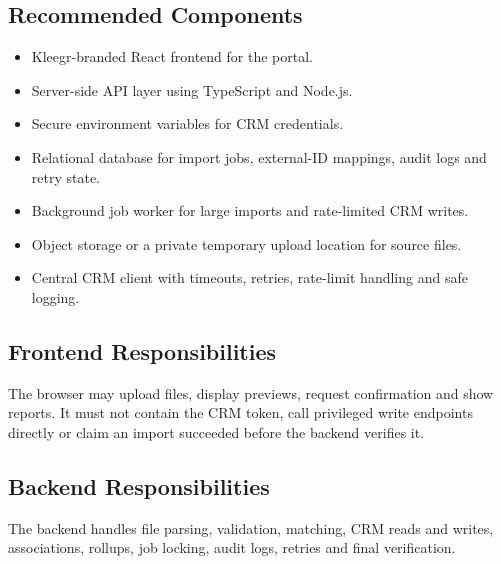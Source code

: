 \documentclass[10pt]{article}
\begin{document}
\subsection{Recommended Components}
\begin{itemize}
\item Kleegr-branded React frontend for the portal.
\item Server-side API layer using TypeScript and Node.js.
\item Secure environment variables for CRM credentials.
\item Relational database for import jobs, external-ID mappings, audit logs and retry state.
\item Background job worker for large imports and rate-limited CRM writes.
\item Object storage or a private temporary upload location for source files.
\item Central CRM client with timeouts, retries, rate-limit handling and safe logging.
\end{itemize}

\subsection{Frontend Responsibilities}
The browser may upload files, display previews, request confirmation and show reports. It must not contain the CRM token, call privileged write endpoints directly or claim an import succeeded before the backend verifies it.

\subsection{Backend Responsibilities}
The backend handles file parsing, validation, matching, CRM reads and writes, associations, rollups, job locking, audit logs, retries and final verification.
\end{document}
